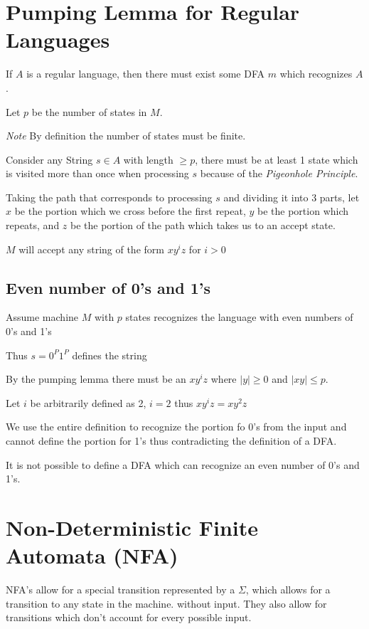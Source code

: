 \documentclass[12pt,letterpaper, twocolumn]{article}
\begin{document}
\section{Pumping Lemma for Regular Languages}

If $A$ is a regular language, then there must exist some DFA $m$ which recognizes $A$. 

Let $p$ be the number of states in $M$. 

\textit{Note} By definition the number of states must be finite. 

Consider any String $s \in A$ with length $\ge p$, there must be at least 1 state which is visited more than once when processing $s$ because of the \textit{Pigeonhole Principle}. 

Taking the path that corresponds to processing $s$ and dividing it into 3 parts, let $x$ be the portion which we cross before the first repeat, $y$ be the portion which repeats, and $z$ be the portion of the path which takes us to an accept state. 

$M$ will accept any string of the form $x{y^i}z$ for $i>0$

\subsection{Even number of 0's and 1's}
Assume machine $M$ with $p$ states recognizes the language with even numbers of 0's and 1's

Thus $s=0^P1^P$ defines the string

By the pumping lemma there must be an $x{y^i}z$ where $|y|\ge0$ and $|xy|\le p$. 

Let $i$ be arbitrarily defined as 2, $i=2$ thus $x{y^i}z=xy^2z$

We use the entire definition to recognize the portion fo 0's from the input and cannot define the portion for 1's thus contradicting the definition of a DFA. 

It is not possible to define a DFA which can recognize an even number of 0's and 1's. 

\section{Non-Deterministic Finite Automata (NFA)}
NFA's allow for a special transition represented by a $\Sigma$, which allows for a transition to any state in the machine. without input. They also allow for transitions which don't account for every possible input. 
\end{document}
